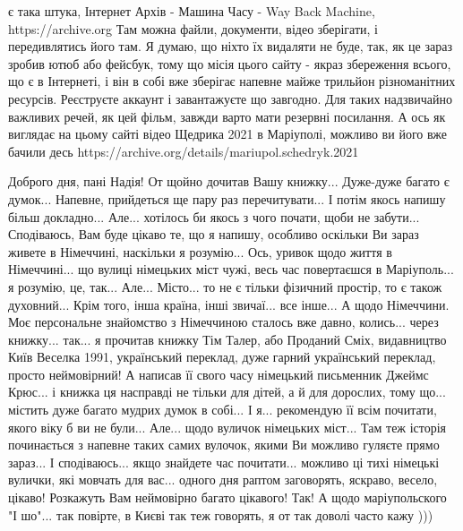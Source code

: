 є така штука, Інтернет Архів - Машина Часу - Way Back Machine,
https://archive.org Там можна файли, документи, відео зберігати, і
передивлятись його там. Я думаю, що ніхто їх видаляти не буде, так, як це зараз
зробив ютюб або фейсбук, тому що місія цього сайту - якраз збереження всього,
що є в Інтернеті, і він в собі вже зберігає напевне майже трильйон
різноманітних ресурсів. Реєструєте аккаунт і завантажуєте що завгодно. Для
таких надзвичайно важливих речей, як цей фільм, завжди варто мати резервні
посилання. А ось як виглядає на цьому сайті відео Щедрика 2021 в Маріуполі,
можливо ви його вже бачили десь
https://archive.org/details/mariupol.schedryk.2021

Доброго дня, пані Надія! От щойно дочитав Вашу книжку... Дуже-дуже багато є
думок... Напевне, прийдеться ще пару раз перечитувати... І потім якось напишу
більш докладно... Але... хотілось би якось з чого почати, щоби не забути...
Сподіваюсь, Вам буде цікаво те, що я напишу, особливо оскільки Ви зараз живете
в Німеччині, наскільки я розумію... Ось, уривок щодо життя в Німеччині... що
вулиці німецьких міст чужі, весь час повертаєшся в Маріуполь... я розумію, це,
так... Але... Місто... то не є тільки фізичний простір, то є також духовний...
Крім того, інша країна, інші звичаї... все інше... А щодо Німеччини. Моє
персональне знайомство з Німеччиною сталось вже давно, колись... через
книжку... так... я прочитав книжку Тім Талер, або Проданий Сміх, видавництво
Київ Веселка 1991, український переклад, дуже гарний український переклад,
просто неймовірний! А написав її свого часу німецький письменник Джеймс Крюс...
і книжка ця насправді не тільки для дітей, а й для дорослих, тому що... містить
дуже багато мудрих думок в собі... І я... рекомендую її всім почитати, якого
віку б ви не були... Але... щодо вуличок німецьких міст... Там теж історія
починається з напевне таких самих вулочок, якими Ви можливо гуляєте прямо
зараз... І сподіваюсь... якщо знайдете час почитати... можливо ці тихі німецькі
вулички, які мовчать для вас... одного дня раптом заговорять, яскраво, весело,
цікаво! Розкажуть Вам неймовірно багато цікавого! Так! А щодо маріупольского "І
шо"... так повірте, в Києві так теж говорять, я от так доволі часто кажу )))
